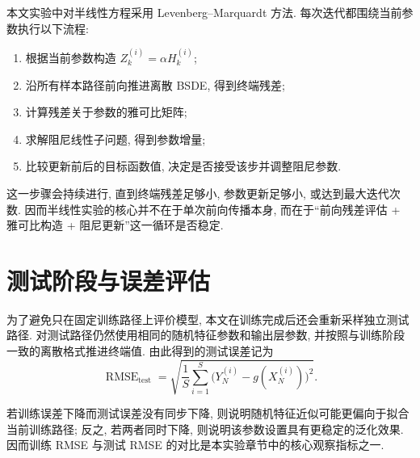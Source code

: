     本文实验中对半线性方程采用 Levenberg--Marquardt 方法.
    每次迭代都围绕当前参数执行以下流程:
    \begin{enumerate}
      \item 根据当前参数构造 $Z_{k}^{(i)} = \alpha H_{k}^{(i)}$;
      \item 沿所有样本路径前向推进离散 BSDE, 得到终端残差;
      \item 计算残差关于参数的雅可比矩阵;
      \item 求解阻尼线性子问题, 得到参数增量;
      \item 比较更新前后的目标函数值, 决定是否接受该步并调整阻尼参数.
    \end{enumerate}

    这一步骤会持续进行, 直到终端残差足够小, 参数更新足够小, 或达到最大迭代次数.
    因而半线性实验的核心并不在于单次前向传播本身,
    而在于“前向残差评估 + 雅可比构造 + 阻尼更新”这一循环是否稳定.

  \section{测试阶段与误差评估}\label{sec:test&eval}
    为了避免只在固定训练路径上评价模型, 本文在训练完成后还会重新采样独立测试路径.
    对测试路径仍然使用相同的随机特征参数和输出层参数,
    并按照与训练阶段一致的离散格式推进终端值.
    由此得到的测试误差记为
    \begin{equation*}
      \operatorname{RMSE}_{\text{test}}
      =
      \sqrt{
        \frac{1}{S}
        \sum_{i = 1}^{S}
        \bigl(
          Y_{N}^{(i)} - g(X_{N}^{(i)})
        \bigr)^{2}
      }.
    \end{equation*}

    若训练误差下降而测试误差没有同步下降, 则说明随机特征近似可能更偏向于拟合当前训练路径;
    反之, 若两者同时下降, 则说明该参数设置具有更稳定的泛化效果.
    因而训练 RMSE 与测试 RMSE 的对比是本实验章节中的核心观察指标之一.
